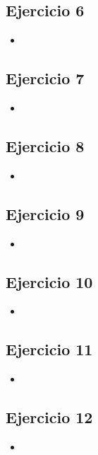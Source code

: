 \documentclass[10pt,a4paper]{article}
\begin{document}
\subsection{Ejercicio 6}
\begin{itemize}
\item
\end{itemize}

\subsection{Ejercicio 7}
\begin{itemize}
\item
\end{itemize}

\subsection{Ejercicio 8}
\begin{itemize}
\item
\end{itemize}

\subsection{Ejercicio 9}
\begin{itemize}
\item
\end{itemize}

\subsection{Ejercicio 10}
\begin{itemize}
\item
\end{itemize}

\subsection{Ejercicio 11}
\begin{itemize}
\item
\end{itemize}

\subsection{Ejercicio 12}
\begin{itemize}
\item
\end{itemize}
\end{document}
